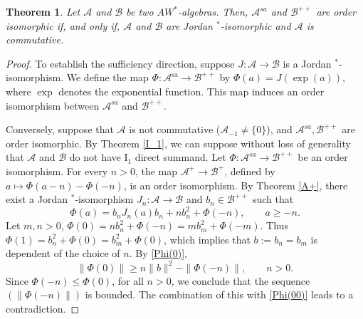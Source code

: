 \documentclass[12pt]{amsart}
\newtheorem{thm}{Theorem}[section]
\theoremstyle{definition}
\theoremstyle{remark}
\numberwithin{equation}{section}
\begin{document}
\begin{thm}\label{++non=sa}
Let $\mathcal{A}$ and $\mathcal{B}$ be two $AW^*$-algebras. Then, $\mathcal{A}^{sa}$  and $\mathcal{B}^{++}$ are order isomorphic if, and only if, $\mathcal{A}$ and $\mathcal{B}$  are Jordan $^*$-isomorphic and $\mathcal{A}$ is commutative.
\end{thm}
\begin{proof}
To establish the sufficiency  direction, suppose $J: \mathcal{A} \to \mathcal{B}$ is a Jordan $^*$-isomorphism. We define the map $\Phi: \mathcal{A}^{\text{sa}} \to \mathcal{B}^{++}$ by $\Phi(a) = J(\exp(a))$, where $\exp$ denotes the  exponential  function. This map induces an order isomorphism between $\mathcal{A}^{sa}$ and $\mathcal{B}^{++}$.	
	
	
	


Conversely, suppose that   $\mathcal{A}$  is not  commutative ($\mathcal{A}_{-1}\neq\{0\}$), and  $\mathcal{A}^{sa}, \mathcal{B}^{++}$  are  order isomorphic. By Theorem \ref{I_1}, we can suppose without loss of generality that $\mathcal{A}$  and $\mathcal{B}$  do not have $\mathrm{I}_1$ direct summand. Let  $\Phi:\mathcal{A}^{sa}\to\mathcal{B}^{++}$  be an order isomorphism. For every $n>0$, the map $\mathcal{A}^{+}\to\mathcal{B}^{+}$, defined by $a\mapsto \Phi(a-n)-\Phi(-n)$, is an order isomorphism. By Theorem \ref{A+}, there exist a Jordan $^*$-isomorphism  $J_n:\mathcal{A}\to\mathcal{B}$ and $b_n\in\mathcal{B}^{++}$ such that 
\begin{equation}\label{Phi(0)}
	\Phi(a)=b_nJ_n(a)b_n+ nb_n^2+\Phi(-n),\qquad a\geq -n.\end{equation}
Let $m,n>0$, $\Phi(0)=nb_n^2+\Phi(-n)=mb_m^2+\Phi(-m)$. Thus $\Phi(1)=b_n^2+\Phi(0)=b_m^{2}+\Phi(0)$, which implies that $b:=b_n=b_m$ is dependent of  the choice of $n$.  By \eqref{Phi(0)}, 
\begin{equation}\label{Phi(00)}
	\|\Phi(0)\|\geq n\|b\|^2-\|\Phi(-n)\|, \qquad n>0.
\end{equation}
Since $\Phi(-n)\leq \Phi(0)$, for all $n>0$, we conclude that the sequence  $(\|\Phi(-n)\|)$ is bounded.  The combination of this with \eqref{Phi(00)} leads to a contradiction.
\end{proof}
\end{document}
